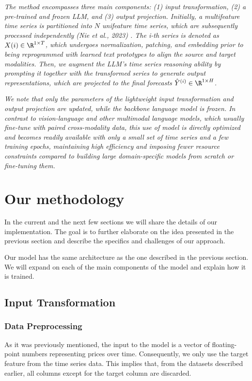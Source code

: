 \textit{The method encompasses three main components: (1) input transformation, (2) a pre-trained and frozen LLM, and (3) output projection. Initially, a multifeature time series is partitioned into \(N\) unifeature time series, which are subsequently processed independently (Nie et al., 2023) \cite{nie_et_al}.
	The i-th series is denoted as \(X(i) \in \R^{1\times T}\), which undergoes normalization, patching, and embedding prior to being reprogrammed with learned text prototypes to align the source and target modalities.
	Then, we augment the LLM’s time series reasoning ability by prompting it together with the transformed series to generate output representations, which are projected to the final forecasts \(\hat{Y}^{(i)} \in \R^{1\times H}\).}

\textit{We note that only the parameters of the lightweight input transformation and output projection are updated, while the backbone language model is frozen.
	In contrast to vision-language and other multimodal language models, which usually fine-tune with paired cross-modality data, this use of model is directly optimized and becomes readily available with only a small set of time series and a few  training epochs, maintaining high efficiency and imposing fewer resource constraints compared to building large domain-specific models from scratch or fine-tuning them.}

\section{Our methodology}
In the current and the next few sections we will share the details of our implementation. The goal is to further elaborate on the idea presented in the previous section and describe the specifics and challenges of our approach.

Our model has the same architecture as the one described in the previous section. We will expand on each of the main components of the model and explain how it is trained.

\subsection{Input Transformation}

\subsubsection*{Data Preprocessing}
As it was previously mentioned, the input to the model is a vector of floating-point numbers representing prices over time. Consequently, we only use the target feature from the time series data. This implies that, from the datasets described earlier, all columns except for the target column are discarded.

